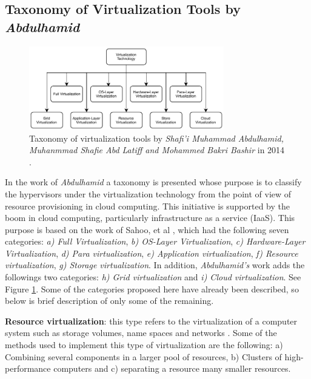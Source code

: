 	\subsection{Taxonomy of Virtualization Tools by \textit{Abdulhamid}}
	
	\begin{figure}[H]
		\centering
		\includegraphics[width=8.5cm]{images/Abdulhamid2014.pdf}
		\vspace{-0.2cm}
		\caption{Taxonomy of virtualization tools by \textit{Shafi'i Muhammad Abdulhamid, Muhanmmad Shafie Abd Latiff and Mohammed Bakri Bashir} in 2014 \cite{Abdulhamid2014}.}
		\label{fig:TaxonomyByAbdulhamid}
	\end{figure}
	
	In the work of \textit{Abdulhamid} \cite{Abdulhamid2014} a taxonomy is presented whose purpose is to classify the hypervisors under the virtualization technology from the point of view of resource provisioning in cloud computing. This initiative is supported by the boom in cloud computing, particularly infrastructure as a service (IaaS). This purpose is based on the work of Sahoo, et al \cite{Sahoo2010}, which had the following seven categories: \textit{a) Full Virtualization}, \textit{b) OS-Layer Virtualization}, \textit{c) Hardware-Layer Virtualization}, \textit{d) Para virtualization}, \textit{e) Application virtualization}, \textit{f) Resource virtualization}, \textit{g) Storage virtualization}. In addition, \textit{Abdulhamid's} work adds the followings two categories: \textit{h) Grid virtualization} and \textit{i) Cloud virtualization}. See Figure \ref{fig:TaxonomyByAbdulhamid}. Some of the categories proposed here have already been described, so below is brief description of only some of the remaining. 
	
	\textbf{Resource virtualization}: this type refers to the virtualization of a computer system such as storage volumes, name spaces and networks \cite{Abdulhamid2014}.	Some of the methods used to implement this type of virtualization are the following: a) Combining several components in a larger pool of resources, b) Clusters of high-performance computers and c) separating a resource many smaller resources.
	
